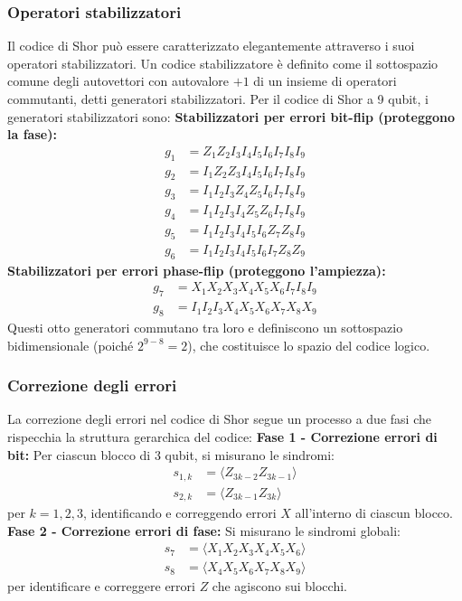 \documentclass[a4paper,12pt]{report}
\theoremstyle{plain}
\begin{document}
\subsubsection{Operatori stabilizzatori}
Il codice di Shor può essere caratterizzato elegantemente attraverso i suoi operatori stabilizzatori. Un codice stabilizzatore è definito come il sottospazio comune degli autovettori con autovalore $+1$ di un insieme di operatori commutanti, detti generatori stabilizzatori.
Per il codice di Shor a 9 qubit, i generatori stabilizzatori sono:
\textbf{Stabilizzatori per errori bit-flip (proteggono la fase):}
\begin{align}
g_1 &= Z_1 Z_2 I_3 I_4 I_5 I_6 I_7 I_8 I_9 \\
g_2 &= I_1 Z_2 Z_3 I_4 I_5 I_6 I_7 I_8 I_9 \\
g_3 &= I_1 I_2 I_3 Z_4 Z_5 I_6 I_7 I_8 I_9 \\
g_4 &= I_1 I_2 I_3 I_4 Z_5 Z_6 I_7 I_8 I_9 \\
g_5 &= I_1 I_2 I_3 I_4 I_5 I_6 Z_7 Z_8 I_9 \\
g_6 &= I_1 I_2 I_3 I_4 I_5 I_6 I_7 Z_8 Z_9
\end{align}
\textbf{Stabilizzatori per errori phase-flip (proteggono l'ampiezza):}
\begin{align}
g_7 &= X_1 X_2 X_3 X_4 X_5 X_6 I_7 I_8 I_9 \\
g_8 &= I_1 I_2 I_3 X_4 X_5 X_6 X_7 X_8 X_9
\end{align}
Questi otto generatori commutano tra loro e definiscono un sottospazio bidimensionale (poiché $2^{9-8} = 2$), che costituisce lo spazio del codice logico.
\subsubsection{Correzione degli errori}
La correzione degli errori nel codice di Shor segue un processo a due fasi che rispecchia la struttura gerarchica del codice:
\textbf{Fase 1 - Correzione errori di bit:}
Per ciascun blocco di 3 qubit, si misurano le sindromi:
\begin{align}
s_{1,k} &= \langle Z_{3k-2} Z_{3k-1} \rangle \\
s_{2,k} &= \langle Z_{3k-1} Z_{3k} \rangle
\end{align}
per $k = 1, 2, 3$, identificando e correggendo errori $X$ all'interno di ciascun blocco.
\textbf{Fase 2 - Correzione errori di fase:}
Si misurano le sindromi globali:
\begin{align}
s_7 &= \langle X_1 X_2 X_3 X_4 X_5 X_6 \rangle \\
s_8 &= \langle X_4 X_5 X_6 X_7 X_8 X_9 \rangle
\end{align}
per identificare e correggere errori $Z$ che agiscono sui blocchi.
\end{document}
